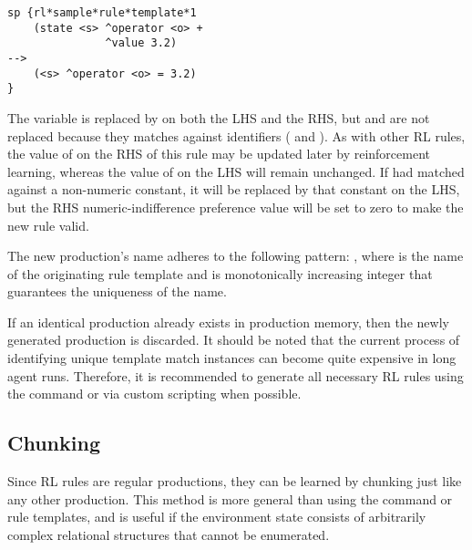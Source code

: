\begin{verbatim}
sp {rl*sample*rule*template*1
    (state <s> ^operator <o> +
               ^value 3.2)
-->
    (<s> ^operator <o> = 3.2)
}
\end{verbatim}

The variable  is replaced by  on both the LHS and the RHS, but  and  are not replaced because they matches against identifiers ( and ).
As with other RL rules, the value of  on the RHS of this rule may be updated later by reinforcement learning, whereas the value of  on the LHS will remain unchanged.
If  had matched against a non-numeric constant, it will be replaced by that constant on the LHS, but the RHS numeric-indifference preference value will be set to zero to make the new rule valid.

The new production's name adheres to the following pattern:
, where  is the name of the originating rule template and  is monotonically increasing integer that guarantees the uniqueness of the name.

If an identical production already exists in production memory, then the newly generated production is discarded.
It should be noted that the current process of identifying unique template match instances can become quite expensive in long agent runs.
Therefore, it is recommended to generate all necessary RL rules using the  command or via custom scripting when possible.

\subsection{Chunking}
Since RL rules are regular productions, they can be learned by chunking just like any other production.
This method is more general than using the  command or rule templates, and is useful if the environment state consists of arbitrarily complex relational structures that cannot be enumerated.
